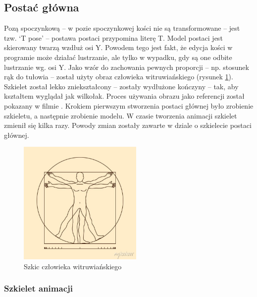 \documentclass[12pt,twoside]{article}
\begin{document}
\clearpage
\subsection{Postać główna}

Pozą spoczynkową -- w pozie spoczynkowej kości nie są transformowane -- jest tzw.
`T pose' -- postawa postaci przypomina literę T. Model postaci jest
skierowany twarzą wzdłuż osi Y. Powodem tego jest fakt, że edycja kości w programie
może działać lustrzanie, ale tylko w wypadku, gdy są one odbite lustrzanie wg.
osi Y. Jako wzór do zachowania pewnych proporcji -- np. stosunek rąk do tułowia –
został użyty obraz człowieka witruwiańskiego (rysunek \ref{VitruvianMan}).
Szkielet został lekko zniekształcony -- zostały wydłużone kończyny -- tak, aby
kształtem wyglądał jak wilkołak. Proces używania obrazu jako referencji został
pokazany w filmie \cite{blender_reference}. Krokiem pierwszym stworzenia postaci
głównej było zrobienie szkieletu, a następnie zrobienie modelu. W czasie
tworzenia animacji szkielet zmienił się kilka razy. Powody zmian zostały zawarte
w dziale o szkielecie postaci głównej.
\begin{figure}[h]

    \centering
	\includegraphics[width=6cm]{RealizacjaProjektu/MC/VitruvianMan.jpg}
	\caption{Szkic człowieka witruwiańskiego}
    \label{VitruvianMan}
\end{figure}

\subsubsection{Szkielet animacji}
\end{document}
